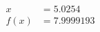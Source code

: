 \documentclass[preview]{standalone}
\begin{document}
\begin{align*}
x &= 5.0254\\f(x) &= 7.9999193
\end{align*}
\end{document}
